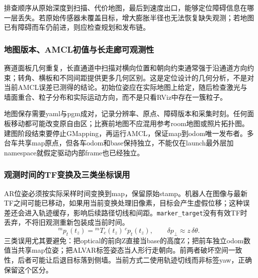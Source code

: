 排查顺序从原始深度到扫描、代价地图，最后到速度出口，能够定位障碍信息在哪一层丢失。若原始传感器未覆盖目标，增大膨胀半径也无法恢复缺失观测；若地图已有障碍而车仍前进，则应检查规划和发布链。


\subsubsection{地图版本、AMCL初值与长走廊可观测性}
赛道面板几何重复，长直通道中扫描对横向位置和朝向约束通常强于沿通道方向约束；转角、横板和不同间距提供更多几何区别。这是定位设计的几何分析，不是对当前AMCL误差已测得的结论。初始位姿应在实际地图上给定，随后检查激光与墙面重合、粒子分布和实际运动方向，而不是只看RViz中存在一簇粒子。

地图保存需要yaml与pgm成对，记录分辨率、原点、障碍版本和采集时刻。任何面板移动都可能改变原自由区；比赛前地图不应混用参考room地图或照片拓扑图。建图阶段结束要停止GMapping，再运行AMCL，保证map到odom唯一发布者。多台车共享map原点，但各车odom和base保持独立，不能仅在launch最外层加namespace就假定驱动内部frame也已经独立。

\subsubsection{观测时间的TF变换及三类坐标误用}
AR位姿必须按实际采样时间变换到map，保留原始stamp。机器人在图像与最新TF之间可能已移动，如果用当前变换处理旧像素，目标会产生虚假位移；这种误差还会进入轨迹缓存，影响后续路径切线和间距。\texttt{marker\_\allowbreak target}没有有效TF时丢弃，不将旧观测重新包装成当前时间。
\begin{equation}
{}^m p_t(t_z)={}^mT_c(t_z)\,{}^cp_t(t_z),\qquad \delta p_{\perp}\approx z\,\delta\theta.
\end{equation}
三类误用尤其要避免：把optical的前向Z直接当base的高度Z；把前车独立odom数值当共享map位姿；把ALVAR标签姿态当人形行走朝向。前两者破坏空间一致性，后者可能让后退目标落到侧墙。当前方式二使用轨迹切线而非标签yaw，正确保留这个区分。

